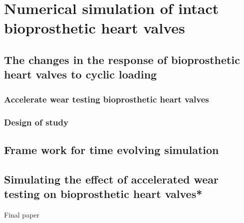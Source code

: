 \chapter{Numerical simulation of intact bioprosthetic heart valves}

\section{The changes in the response of bioprosthetic heart valves to cyclic loading}
\subsection{Accelerate wear testing bioprosthetic heart valves}
\subsection{Design of study}

\section{Frame work for time evolving simulation}

\section{Simulating the effect of accelerated wear testing on bioprosthetic heart valves*}

Final paper